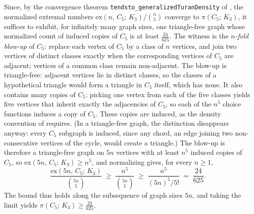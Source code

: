 \documentclass{article}
\newcommand{\tdensity}[2]{\pi(#1;\,#2)}
\newcommand{\lean}[1]{\texttt{#1}}
\begin{document}
Since, by the convergence theorem
\lean{tendsto\_\allowbreak generalizedTuranDensity} of ,
the normalized extremal numbers $\mathrm{ex}(n,\,C_5;\,K_3)/\binom{n}{5}$
converge to $\tdensity{C_5}{K_3}$, it suffices to exhibit, for infinitely many
graph sizes, one triangle-free graph whose normalized count of induced copies of
$C_5$ is at least $\tfrac{24}{625}$.  The
witness is the \emph{$n$-fold blow-up} of $C_5$: replace each vertex of
$C_5$ by a class of $n$ vertices, and join two vertices of distinct
classes exactly when the corresponding vertices of $C_5$ are adjacent;
vertices
of a common class remain non-adjacent.  The blow-up is triangle-free:
adjacent vertices lie in distinct classes, so the classes of a hypothetical
triangle would form a triangle in $C_5$ itself, which has none.  It also
contains many copies of $C_5$: picking one vertex from each of the five
classes
yields five vertices that inherit exactly the adjacencies of $C_5$, so each
of the $n^5$ choice functions induces a copy of $C_5$.  These copies are
induced, as the density
convention of  requires.  (In a triangle-free graph, the
distinction disappears anyway: every $C_5$ subgraph is induced, since any
chord, an edge joining two non-consecutive vertices of the cycle, would
create a triangle.)  The blow-up is therefore a
triangle-free graph on $5n$ vertices with at least $n^5$ induced copies
of~$C_5$,
so $\mathrm{ex}(5n,\,C_5;\,K_3)\geq n^5$, and normalizing gives, for every
$n\geq1$,
\[
  \frac{\mathrm{ex}(5n,\,C_5;\,K_3)}{\binom{5n}{5}}
  \;\geq\;
  \frac{n^5}{\binom{5n}{5}}
  \;\geq\;
  \frac{n^5}{(5n)^5 / 5!}
  \;=\;
  \frac{24}{625}.
\]
The bound thus holds along the subsequence of graph sizes $5n$, and taking the
limit yields $\tdensity{C_5}{K_3}\geq\tfrac{24}{625}$.
\end{document}
